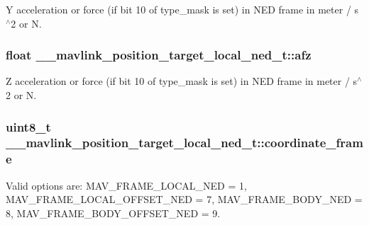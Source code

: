 Y acceleration or force (if bit 10 of type\+\_\+mask is set) in N\+E\+D frame in meter / s$^\wedge$2 or N. 

\hypertarget{struct____mavlink__position__target__local__ned__t_a1aa7e3282c618f07e12efcae4f4071c3}{
\subsubsection[{afz}]{\setlength{\rightskip}{0pt plus 5cm}float \+\_\+\+\_\+mavlink\+\_\+position\+\_\+target\+\_\+local\+\_\+ned\+\_\+t\+::afz}}\label{struct____mavlink__position__target__local__ned__t_a1aa7e3282c618f07e12efcae4f4071c3}


Z acceleration or force (if bit 10 of type\+\_\+mask is set) in N\+E\+D frame in meter / s$^\wedge$2 or N. 

\hypertarget{struct____mavlink__position__target__local__ned__t_a8db581d33f76e8a961934b48cbee7316}{
\subsubsection[{coordinate\+\_\+frame}]{\setlength{\rightskip}{0pt plus 5cm}uint8\+\_\+t \+\_\+\+\_\+mavlink\+\_\+position\+\_\+target\+\_\+local\+\_\+ned\+\_\+t\+::coordinate\+\_\+frame}}\label{struct____mavlink__position__target__local__ned__t_a8db581d33f76e8a961934b48cbee7316}


Valid options are\+: M\+A\+V\+\_\+\+F\+R\+A\+M\+E\+\_\+\+L\+O\+C\+A\+L\+\_\+\+N\+E\+D = 1, M\+A\+V\+\_\+\+F\+R\+A\+M\+E\+\_\+\+L\+O\+C\+A\+L\+\_\+\+O\+F\+F\+S\+E\+T\+\_\+\+N\+E\+D = 7, M\+A\+V\+\_\+\+F\+R\+A\+M\+E\+\_\+\+B\+O\+D\+Y\+\_\+\+N\+E\+D = 8, M\+A\+V\+\_\+\+F\+R\+A\+M\+E\+\_\+\+B\+O\+D\+Y\+\_\+\+O\+F\+F\+S\+E\+T\+\_\+\+N\+E\+D = 9. 

